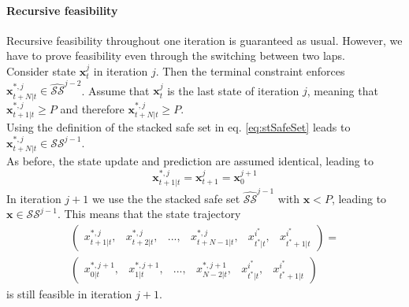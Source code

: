 \paragraph{Recursive feasibility}
Recursive feasibility throughout one iteration is guaranteed as usual. However, we have to prove feasibility even through the switching between two laps.\\
Consider state $\bm{x}_t^j$ in iteration $j$. Then the terminal constraint enforces $\bm{x}_{t+N|t}^{*,j}\in\hat{\mathcal{SS}}^{j-2}$. Assume that $\bm{x}_t^j$ is the last state of iteration $j$, meaning that $\bm{x}_{t+1|t}^{*,j}\geq P$ and therefore $\bm{x}_{t+N|t}^{*,j}\geq P$.\\
Using the definition of the stacked safe set in eq. \ref{eq:stSafeSet} leads to $\bm{x}_{t+N|t}^{*,j}\in\mathcal{SS}^{j-1}$.\\
As before, the state update and prediction are assumed identical, leading to
\begin{equation}
\bm{x}_{t+1|t}^{*,j}=\bm{x}_{t+1}^j=\bm{x}_{0}^{j+1}
\end{equation}
In iteration $j+1$ we use the the stacked safe set $\hat{\mathcal{SS}}^{j-1}$ with $\bm{x}<P$, leading to $\bm{x}\in\mathcal{SS}^{j-1}$. This means that the state trajectory
\begin{align}
\begin{pmatrix}
x_{t+1|t}^{*,j}, & x_{t+2|t}^{*,j}, &...,&x_{t+N-1|t}^{*,j}, &x_{t^*|t}^{i^*}, &x_{t^*+1|t}^{i^*}
\end{pmatrix}
=\\
\begin{pmatrix}
x_{0|t}^{*,j+1}, & x_{1|t}^{*,j+1}, &...,&x_{N-2|t}^{*,j+1}, &x_{t^*|t}^{i^*}, &x_{t^*+1|t}^{i^*}
\end{pmatrix}
\end{align}
is still feasible in iteration $j+1$.
